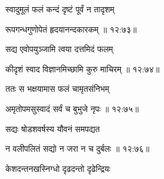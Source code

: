 {\devanagarifont स्वादुमूलं फलं कन्दं दृष्टं पूर्वं न तादृशम् \thinspace{\dandab} \dontdisplaylinenum }%


{\devanagarifont रूपगन्धगुणोपेतं हृदयानन्दकारकम् {॥ १२:७३॥} \veg\dontdisplaylinenum }%

{\devanagarifont सद्य एवोपयुञ्जामि त्वया दत्तमिदं फलम् \thinspace{\dandab} \dontdisplaylinenum }%


{\devanagarifont कीदृशं स्वाद विज्ञानमिच्छामि कुरु माचिरम् {॥ १२:७४॥} \veg\dontdisplaylinenum }%

{\devanagarifont ततः स भक्षयामास फलं चामृतसंनिभम् \thinspace{\dandab} \dontdisplaylinenum }%


{\devanagarifont अमृतोपमसुस्वादं सर्वं च बुभुजे नृपः {॥ १२:७५॥} \veg\dontdisplaylinenum }%

{\devanagarifont सद्यः षोडशवर्षस्य यौवनं समपद्यत \thinspace{\dandab} \dontdisplaylinenum }%


{\devanagarifont न वलीपलितं सद्यो न जरा न च दुर्बलः {॥ १२:७६॥} \veg\dontdisplaylinenum }%

{\devanagarifont केशदन्तनखस्निग्धो दृढदन्तो दृढेन्द्रियः \thinspace{\dandab} \dontdisplaylinenum }%

